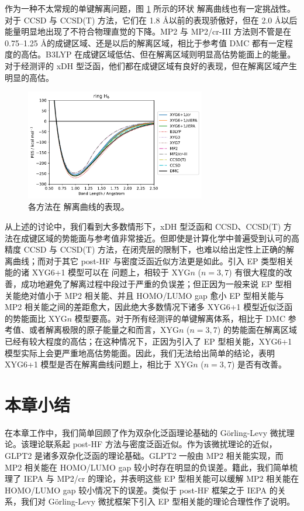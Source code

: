 作为一种不太常规的单键解离问题，图 \ref{fig.2.curve-H6} 所示的环状  解离曲线也有一定挑战性。对于 CCSD 与 CCSD(T) 方法，它们在 1.8 \AA 以前的表现骄傲好，但在 2.0 \AA 以后能量明显地出现了不符合物理直觉的下降。MP2 与 MP2/cr-III 方法则不管是在 0.75--1.25 \AA 的成键区域、还是以后的解离区域，相比于参考值 DMC 都有一定程度的高估。B3LYP 在成键区域低估、但在解离区域则明显高估势能面上的能量。对于经测评的 xDH 型泛函，他们都在成键区域有良好的表现，但在解离区域产生明显的高估。

\begin{figure}[h]
  \centering
  \includegraphics[width=0.7\textwidth]{assets/curve-H6.pdf}
  \caption[ 解离曲线表现]{各方法在  解离曲线的表现。}
  \label{fig.2.curve-H6}
\end{figure}

从上述的讨论中，我们看到大多数情形下，xDH 型泛函和 CCSD、CCSD(T) 方法在成键区域的势能面与参考值非常接近。但即使是计算化学中普遍受到认可的高精度 CCSD 与 CCSD(T) 方法，在闭壳层的限制下，也难以给出定性上正确的解离曲线；而对于其它 post-HF 与密度泛函近似方法更是如此。引入 EP 类型相关能的诸 XYG6+1 模型可以在  问题上，相较于 XYG$n$ ($n=3,7$) 有很大程度的改善，成功地避免了解离过程中段过于严重的负误差；但正因为一般来说 EP 型相关能绝对值小于 MP2 相关能、并且 HOMO/LUMO gap 愈小 EP 型相关能与 MP2 相关能之间的差距愈大，因此绝大多数情况下诸多 XYG6+1 模型近似泛函的势能面比 XYG$n$ 模型要高。对于所有经测评的单键解离体系，相比于 DMC 参考值、或者解离极限的原子能量之和而言，XYG$n$ ($n=3,7$) 的势能面在解离区域已经有较大程度的高估；在这种情况下，正因为引入了 EP 型相关能，XYG6+1 模型实际上会更严重地高估势能面。因此，我们无法给出简单的结论，表明 XYG6+1 模型是否在解离曲线问题上，相比于 XYG$n$ ($n=3,7$) 是否有改善。

\section{本章小结}

在本章工作中，我们简单回顾了作为双杂化泛函理论基础的 G\"orling-Levy 微扰理论。该理论联系起 post-HF 方法与密度泛函近似。作为该微扰理论的近似，GLPT2 是诸多双杂化泛函的理论基础。GLPT2 一般由 MP2 相关能实现，而 MP2 相关能在 HOMO/LUMO gap 较小时存在明显的负误差。籍此，我们简单梳理了 IEPA 与 MP2/cr 的理论，并表明这些 EP 型相关能可以缓解 MP2 相关能在 HOMO/LUMO gap 较小情况下的误差。类似于 post-HF 框架之于 IEPA 的关系，我们对 G\"orling-Levy 微扰框架下引入 EP 型相关能的理论合理性作了说明。

